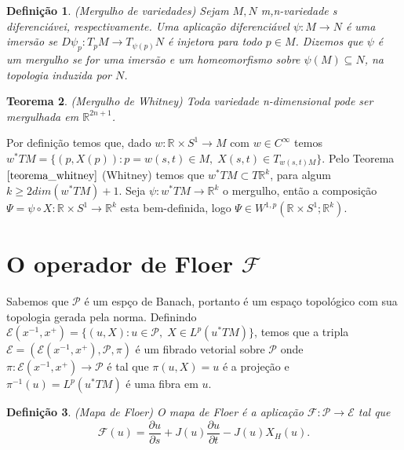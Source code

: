 \documentclass[12pt]{book}
\newtheorem{teorema}{Teorema}[section]
\newtheorem{definicao}[teorema]{Definição}
\newcommand{\caminhosexponenciaisconectantesabrev}{\mathcal{P}}
\newcommand{\circulo}{S^{1}}
\newcommand{\derivadaparcial}[2]{\frac{\partial #1}{\partial #2}}
\newcommand{\espacosobolevcontradominio}[2]{W^{1,p}(#1;#2)}
\newcommand{\fibradocaminhosexponenciais}{\mathcal{E}(x^{-1}, x^{+})}
\newcommand{\fibradocaminhosexponenciaisabrev}{\mathcal{E}}
\newcommand{\mapafloer}{\mathcal{F}}
\newcommand{\mapafloerdefinicao}[1]{\derivadaparcial{#1}{s} + J(#1)\derivadaparcial{#1}{t} - J(#1)X_{H}(#1)}
\newcommand{\mapafloerparametro}[1]{\mathcal{F}(#1)}
\newcommand{\pullbackfibradotangente}[2]{#1^{*}T#2}
\newcommand{\pullbackfibradotangenteM}[1]{\pullbackfibradotangente{#1}{M}}
\newcommand{\retacartesianocirculo}{\real{} \times \circulo}
\newcommand{\real}[1]{\mathbb{R}^{#1}}
\begin{document}
	\begin{definicao}\label{definicao_mergulho_variedades}
		(Mergulho de variedades) Sejam $M, N$ m,n-variedade s diferenciávei, respectivamente. Uma aplicação diferenciável $\psi:M\to N$ é uma imersão se $D\psi_{p}:T_{p}M\to T_{\psi(p)}N$ é injetora para todo $p \in M$. Dizemos que $\psi$ é um mergulho se for uma imersão e um homeomorfismo sobre $\psi(M) \subseteq N$, na topologia induzida por $N$. 
	\end{definicao}
	
	\begin{teorema}\label{teorema_whitney}
		(Mergulho de Whitney) Toda variedade n-dimensional pode ser mergulhada em $\real{2n+1}$.
	\end{teorema}
	
	Por definição temos que, dado $w : \retacartesianocirculo \to M $ com $w \in C^{\infty}$ temos $\pullbackfibradotangenteM{w} = \{(p, X(p)) : p = w(s,t) \in M, \; X(s,t) \in T_{w(s,t)M} \}$. Pelo Teorema $\ref{teorema_whitney}$ (Whitney) temos que $\pullbackfibradotangenteM{w} \subset T\real{k}$, para algum $k \geq 2 dim(\pullbackfibradotangenteM{w}) +1$. Seja $\psi : \pullbackfibradotangenteM{w} \to \real{k}$ o mergulho, então a composição $\Psi=\psi \circ X:\retacartesianocirculo \to \real{k}$ esta bem-definida, logo $\Psi \in \espacosobolevcontradominio{\retacartesianocirculo}{\real{k}}$. 
	
	\section{O operador de Floer $\mapafloer$}
	
	Sabemos que $\caminhosexponenciaisconectantesabrev$ é um espço de Banach, portanto é um espaço topológico com sua topologia gerada pela norma. Definindo $\fibradocaminhosexponenciais =\{(u, X): u \in \caminhosexponenciaisconectantesabrev,\; X \in L^{p}(\pullbackfibradotangenteM{u})\}$, temos que a tripla $
	\fibradocaminhosexponenciaisabrev= (\fibradocaminhosexponenciais, \caminhosexponenciaisconectantesabrev, \pi)
	$ é um fibrado vetorial sobre $\caminhosexponenciaisconectantesabrev$  onde $\pi: \fibradocaminhosexponenciais \to \caminhosexponenciaisconectantesabrev$ é tal que $\pi(u, X)=u$ é a projeção e $\pi^{-1}(u) = L^{p}(\pullbackfibradotangenteM{u})$ é uma fibra em $u$.
	
	\begin{definicao}
		(Mapa de Floer) O mapa de Floer é a aplicação $\mapafloer: \caminhosexponenciaisconectantesabrev \to \fibradocaminhosexponenciaisabrev$ tal que
		$$
		\mapafloerparametro{u} =\mapafloerdefinicao{u}.
		$$
	\end{definicao}
	
\end{document}
